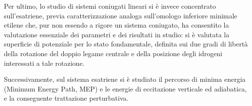 Per ultimo, lo studio di sistemi coniugati lineari si \`e invece concentrato
sull'esatriene, previa caratterizzazione analoga sull'omologo inferiore
minimale etilene che, pur non essendo a rigore un sistema coniugato, ha
consentito la valutazione essenziale dei parametri e dei risultati in
studio: si \`e valutata la superficie di potenziale per lo stato
fondamentale, definita sui due gradi di libert\`a della rotazione del doppio
legame centrale e della posizione degli idrogeni interessati a tale
rotazione. 

Successivamente, sul sistema esatriene si \`e studiato il percorso di minima
energia (Minimum Energy Path, MEP) e le energie di eccitazione verticale ed
adiabatica, e la conseguente trattazione perturbativa.




